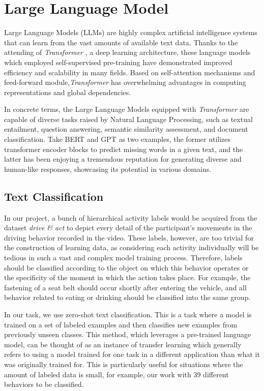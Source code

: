 \section{Large Language Model}
Large Language Models (LLMs) are highly complex artificial intelligence systems that can learn from the vast amounts of available text data\cite{radford2018improving}. Thanks to the attending of \textit{Transformer} \cite{vaswani2017attention}, a deep learning architecture, these language models which employed self-supervised pre-training have demonstrated improved efficiency and scalability in many fields.
 Based on self-attention mechanisms and feed-forward module,\textit{Transformer} has overwhelming advantages in computing representations and global dependencies.

In concrete terms, the Large Language Models equipped with \textit{Transformer} are capable of diverse tasks raised by Natural Language Processing\cite{chowdhary2020natural}, such as textual entailment, question answering, semantic similarity assessment, and document classification. Take BERT\cite{alaparthi2020bidirectional} and GPT \cite{radford2018improving,radford2019language,brown2020language} as two examples, the former utilizes transformer encoder blocks to predict missing words in a given text, and the latter has been enjoying a tremendous reputation for generating diverse and human-like responses, showcasing its potential in various domains.

    \subsection{Text Classification}
In our project, a bunch of hierarchical activity labels would be acquired from the dataset \textit{drive \& act} to depict every detail of the participant's movements in the driving behavior recorded in the video. These labels, however, are too trivial for the construction of learning data, as considering each activity individually will be tedious in such a vast and complex model training process. Therefore, labels should be classified according to the object on which this behavior operates or the specificity of the moment in which the action takes place. For example, the fastening of a seat belt should occur shortly after entering the vehicle, and all behavior related to eating or drinking should be classified into the same group.

In our task, we use zero-shot text classification. This is a task where a model is trained on a set of labeled examples and then classifies new examples from previously unseen classes. This method, which leverages a pre-trained language model, can be thought of as an instance of transfer learning which generally refers to using a model trained for one task in a different application than what it was originally trained for. This is particularly useful for situations where the amount of labeled data is small, for example, our work with 39 different behaviors to be classified.


